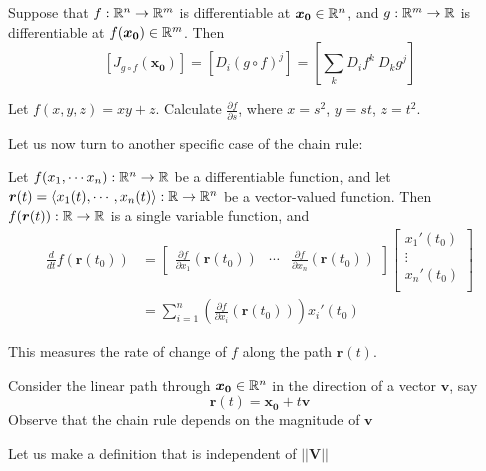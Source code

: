 \begin{corollary}
    Suppose that $f : \mathbb{R}^n \to \mathbb{R}^m$ is differentiable at $\bm{x_0} \in \mathbb{R}^n$, and $g: \mathbb{R}^m \to \mathbb{R}$ is differentiable at $f(\bm{x_0}) \in \mathbb{R}^m$. Then
$$\left[J_{g\circ f}(\bm{x_0})\right] = \left[D_i(g \circ f)^j\right] = \left[\sum_k  D_i f^k \ D_k g^j\right]$$
\end{corollary} 

\begin{example}
    Let $f(x,y,z) = xy + z$.  Calculate $\frac{\partial f}{\partial s}$, where $x = s^2$, $y = st$, $z = t^2$.
\end{example}


Let us now turn to another specific case of the chain rule:  

\begin{proposition}
    Let $f(x_1, \cdots x_n) : \mathbb{R}^n \to \mathbb{R}$ be a differentiable function, and let $\bm{r}(t) = \langle x_1(t), \cdots, x_n(t) \rangle : \mathbb{R} \to \mathbb{R}^n$ be a vector-valued function.  Then $f(\bm{r}(t)) : \mathbb{R} \to \mathbb{R}$ is a single variable function, and 
    \begin{align*}
        \frac{d}{dt}f(\bm{r}(t_0)) &= \begin{bmatrix}
\frac{\partial f}{\partial x_1}(\bm{r}(t_0)) & \cdots & \frac{\partial f}{\partial x_n}(\bm{r}(t_0))
\end{bmatrix} \begin{bmatrix}
x_1'(t_0) \\
\vdots \\
x_n'(t_0) \\
\end{bmatrix} \\
&= \sum_{i=1}^n
\left(\frac{\partial f}{\partial x_i}(\bm{r}(t_0)) \right) x_i'(t_0)
    \end{align*}
    \end{proposition}


This measures the rate of change of $f$ along the path $\bm{r}(t)$.




\begin{example}
    Consider the linear path through $\bm{x_0} \in \mathbb{R}^n$ in the direction of a vector $\bm{v}$, say $$\bm{r}(t) = \bm{x_0} + t\bm{v}$$  Observe that the chain rule depends on the magnitude of $\bm{v}$

\end{example}

Let us make a definition that is independent of $||\bm{V}||$

